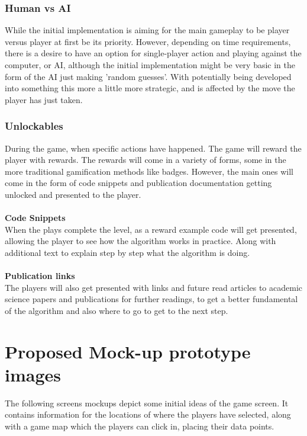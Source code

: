 \documentclass[a4paper,10pt]{article}
\begin{document}
\subsubsection{Human vs AI}
While the initial implementation is aiming for the main gameplay to be player versus player at first be its priority. However, depending on time requirements, there is a desire to have an option for single-player action and playing against the computer, or AI, although the initial implementation might be very basic in the form of the AI just making 'random guesses'. With potentially being developed into something this more a little more strategic, and is affected by the move the player has just taken.

\subsubsection{Unlockables}
During the game, when specific actions have happened. The game will reward the player with rewards. The rewards will come in a variety of forms, some in the more traditional gamification methods like badges. However, the main ones will come in the form of code snippets and publication documentation getting unlocked and presented to the player. \\
 \\
\textbf{Code Snippets}\\
When the plays complete the level, as a reward example code will get presented, allowing the player to see how the algorithm works in practice. Along with additional text to explain step by step what the algorithm is doing. \\
 \\
\textbf{Publication links}\\
The players will also get presented with links and future read articles to academic science papers and publications for further readings, to get a better fundamental of the algorithm and also where to go to get to the next step.

\section{Proposed Mock-up prototype images}
The following screens mockups depict some initial ideas of the game screen. It contains information for the locations of where the players have selected, along with a game map which the players can click in, placing their data points.
\end{document}
